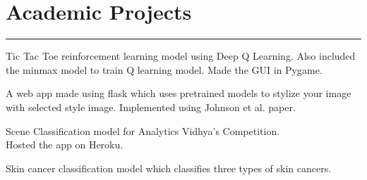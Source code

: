 \documentclass[]{puneet-resume}
\begin{document}
\begin{minipage}[t]{0.66\textwidth}
\section{Academic Projects}
\noindent\rule{12.5cm}{0.4pt}
 
\noindent
\hspace{5em}%
\begin{minipage}{0.85\textwidth\vspace{2pt}}
Tic Tac Toe reinforcement learning model using Deep Q Learning.
Also included the minmax model to train Q learning model.
Made the GUI in Pygame.
\end{minipage}
 
\noindent
\hspace{5em}%
\begin{minipage}{0.85\textwidth\vspace{2pt}}
A web app made using flask which uses pretrained models to stylize your image
with selected style image. Implemented using Johnson et al. paper.
\end{minipage}
 
\noindent
\hspace{5em}%
\begin{minipage}{0.85\textwidth\vspace{2pt}}
Scene Classification model for Analytics Vidhya's Competition.\\
Hosted the app on Heroku.
\end{minipage}
 
\noindent
\hspace{5em}%
\begin{minipage}{0.85\textwidth\vspace{2pt}}
Skin cancer classification model which classifies three types of skin cancers.
\end{minipage}
\end{minipage} 
\end{document}

